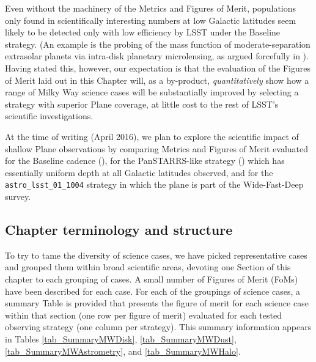     Even without the machinery of the Metrics and Figures
  of Merit, populations only found in scientifically interesting
  numbers at low Galactic latitudes seem likely to be detected only
  with low efficiency by LSST under the Baseline strategy. (An example
  is the probing of the mass function of moderate-separation
  extrasolar planets via intra-disk planetary microlensing, as argued
  forcefully in \citet{gould13}). Having stated this,
  however, our expectation is that the evaluation of the Figures of
  Merit laid out in this Chapter will, as a by-product, {\it
    quantitatively} show how a range of Milky Way science cases will
  be substantially improved by selecting a strategy with superior
  Plane coverage, at little cost to the rest of LSST's scientific
  investigations.

At the time of writing (April 2016), we plan to explore the scientific
  impact of shallow Plane observations by comparing Metrics and
  Figures of Merit evaluated for the Baseline cadence
  (), for the PanSTARRS-like strategy
  () which has essentially uniform depth at all Galactic latitudes observed, 
  and for the {\tt astro\_lsst\_01\_1004} strategy in which the plane is part of the Wide-Fast-Deep survey.

\subsection{Chapter terminology and structure}

To try to tame the diversity of science cases, we have picked
representative cases and grouped them within broad scientific areas,
devoting one Section of this chapter to each grouping of cases. A
small number of Figures of Merit (FoMs) have been described for each
case. For each of the groupings of science cases, a summary Table is
provided that presents the figure of merit for each science case
within that section (one row per figure of merit) evaluated for each
tested observing strategy (one column per strategy). This summary
information appears in Tables \ref{tab_SummaryMWDisk}, \ref{tab_SummaryMWDust}, \ref{tab_SummaryMWAstrometry}, and  \ref{tab_SummaryMWHalo}.


